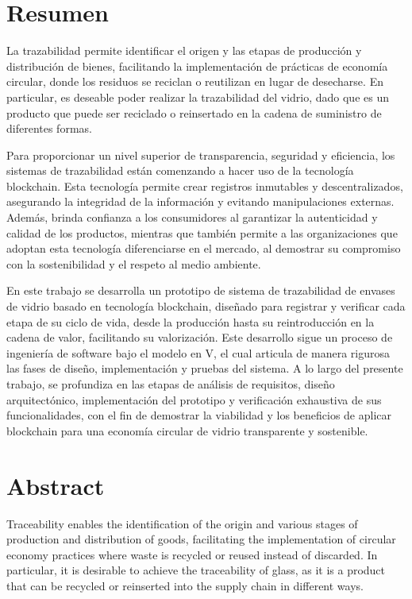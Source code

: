 \thispagestyle{plain}
\chapter*{Resumen}

La trazabilidad permite identificar el origen y las etapas de producción y distribución de bienes, facilitando la implementación de prácticas de economía circular, donde los residuos se reciclan o reutilizan en lugar de desecharse. En particular, es deseable poder realizar la trazabilidad del vidrio, dado que es un producto que puede ser reciclado o reinsertado en la cadena de suministro de diferentes formas.

Para proporcionar un nivel superior de transparencia, seguridad y eficiencia, los sistemas de trazabilidad están comenzando a hacer uso de la tecnología blockchain. Esta tecnología permite crear registros inmutables y descentralizados, asegurando la integridad de la información y evitando manipulaciones externas. Además, brinda confianza a los consumidores al garantizar la autenticidad y calidad de los productos, mientras que también permite a las organizaciones que adoptan esta tecnología diferenciarse en el mercado, al demostrar su compromiso con la sostenibilidad y el respeto al medio ambiente.

En este trabajo se desarrolla un prototipo de sistema de trazabilidad de envases de vidrio basado en tecnología blockchain, diseñado para registrar y verificar cada etapa de su ciclo de vida, desde la producción hasta su reintroducción en la cadena de valor, facilitando su valorización. Este desarrollo sigue un proceso de ingeniería de software bajo el modelo en V, el cual articula de manera rigurosa las fases de diseño, implementación y pruebas del sistema. A lo largo del presente trabajo, se profundiza en las etapas de análisis de requisitos, diseño arquitectónico, implementación del prototipo y verificación exhaustiva de sus funcionalidades, con el fin de demostrar la viabilidad y los beneficios de aplicar blockchain para una economía circular de vidrio transparente y sostenible.

\chapter*{Abstract}

Traceability enables the identification of the origin and various stages of production and distribution of goods, facilitating the implementation of circular economy practices where waste is recycled or reused instead of discarded. In particular, it is desirable to achieve the traceability of glass, as it is a product that can be recycled or reinserted into the supply chain in different ways.

